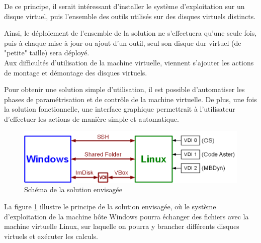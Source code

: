 De ce principe, il serait intéressant d'installer le système d'exploitation sur un disque virtuel, puis l'ensemble des outils utilisés sur des disques virtuels distincts.

Ainsi, le déploiement de l'ensemble de la solution ne s'effectuera qu'une seule fois, puis à chaque mise à jour ou ajout d'un outil, seul son disque dur virtuel (de "petite" taille) sera déployé.
\\


Aux difficultés d'utilisation de la machine virtuelle, viennent s'ajouter les actions de montage et démontage des disques virtuels.

Pour obtenir une solution simple d'utilisation, il est possible d'automatiser les phases de paramétrisation et de contrôle de la machine virtuelle.
De plus, une fois la solution fonctionnelle, une interface graphique permettrait à l'utilisateur d'effectuer les actions de manière simple et automatique.
\\


\begin{figure}[!h]
	\center
	\includegraphics[scale=0.5]{images/Solution_envisagee.png}
	\caption{Schéma de la solution envisagée}
	\label{Schéma Solution envisagée}
\end{figure}

La figure \ref{Schéma Solution envisagée} illustre le principe de la solution envisagée, où le système d'exploitation de la machine hôte Windows pourra échanger des fichiers avec la machine virtuelle Linux, sur laquelle on pourra y brancher différents disques virtuels et exécuter les calculs.